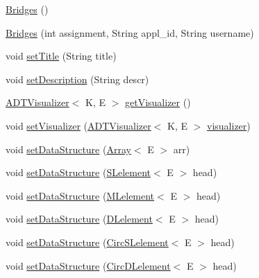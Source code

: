 \begin{DoxyCompactItemize}
\item 
\hyperlink{classbridges_1_1connect_1_1_bridges_a4925cf146eff9ff84e89351ab574795d}{Bridges} ()
\item 
\hyperlink{classbridges_1_1connect_1_1_bridges_a297e7ca95c725fa20bce0768c2d9aa64}{Bridges} (int assignment, String appl\+\_\+id, String username)
\item 
void \hyperlink{classbridges_1_1connect_1_1_bridges_a90c7f6b2b99d88bf241ea7247db47045}{set\+Title} (String title)
\item 
void \hyperlink{classbridges_1_1connect_1_1_bridges_a161206b37c2acdf435f4444679616eec}{set\+Description} (String descr)
\item 
\hyperlink{classbridges_1_1base_1_1_a_d_t_visualizer}{A\+D\+T\+Visualizer}$<$ K, E $>$ \hyperlink{classbridges_1_1connect_1_1_bridges_a7193b48c9dc01b04dfcf0d66fa2f59fb}{get\+Visualizer} ()
\item 
void \hyperlink{classbridges_1_1connect_1_1_bridges_ad627f604914734646e92fac9e7b385d8}{set\+Visualizer} (\hyperlink{classbridges_1_1base_1_1_a_d_t_visualizer}{A\+D\+T\+Visualizer}$<$ K, E $>$ \hyperlink{classbridges_1_1connect_1_1_bridges_af3fc35779b31c976ed8bf2e173310502}{visualizer})
\item 
void \hyperlink{classbridges_1_1connect_1_1_bridges_a2cd9af150b77b8337327ea67544a0e8f}{set\+Data\+Structure} (\hyperlink{classbridges_1_1base_1_1_array}{Array}$<$ E $>$ arr)
\item 
void \hyperlink{classbridges_1_1connect_1_1_bridges_ae41b3d86963350ace304d8951c1863ad}{set\+Data\+Structure} (\hyperlink{classbridges_1_1base_1_1_s_lelement}{S\+Lelement}$<$ E $>$ head)
\item 
void \hyperlink{classbridges_1_1connect_1_1_bridges_aa0538ceb84f553a9c5a1cbc7a93a46ae}{set\+Data\+Structure} (\hyperlink{classbridges_1_1base_1_1_m_lelement}{M\+Lelement}$<$ E $>$ head)
\item 
void \hyperlink{classbridges_1_1connect_1_1_bridges_a383877f85bb048d47560e76f359e1bda}{set\+Data\+Structure} (\hyperlink{classbridges_1_1base_1_1_d_lelement}{D\+Lelement}$<$ E $>$ head)
\item 
void \hyperlink{classbridges_1_1connect_1_1_bridges_a285a7af5ad0594d4eeca51277e627c89}{set\+Data\+Structure} (\hyperlink{classbridges_1_1base_1_1_circ_s_lelement}{Circ\+S\+Lelement}$<$ E $>$ head)
\item 
void \hyperlink{classbridges_1_1connect_1_1_bridges_a4e5809b18d15854b54509f9d434a4fd7}{set\+Data\+Structure} (\hyperlink{classbridges_1_1base_1_1_circ_d_lelement}{Circ\+D\+Lelement}$<$ E $>$ head)

\end{DoxyCompactItemize}
